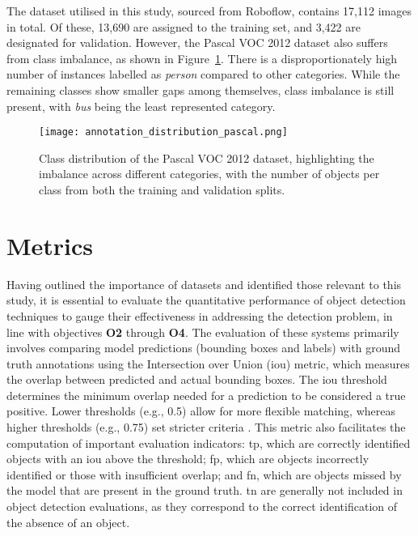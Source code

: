 The dataset utilised in this study, sourced from Roboflow, contains 17,112 images in total. Of these, 13,690 are assigned to the training set, and 3,422 are designated for validation. However, the Pascal VOC 2012 dataset also suffers from class imbalance, as shown in Figure~\ref{fig:class_distribution_pascal_voc}. There is a disproportionately high number of instances labelled as \textit{person} compared to other categories. While the remaining classes show smaller gaps among themselves, class imbalance is still present, with \textit{bus} being the least represented category.

\begin{figure}[!ht]
    \centering
    \texttt{[image: annotation\_distribution\_pascal.png]}
    \caption{Class distribution of the Pascal VOC 2012 dataset, highlighting the imbalance across different categories, with the number of objects per class from both the training and validation splits.}
    \label{fig:class_distribution_pascal_voc}%
\end{figure}

\section{Metrics}
\label{sec:4_metrics}

Having outlined the importance of datasets and identified those relevant to this study, it is essential to evaluate the quantitative performance of object detection techniques to gauge their effectiveness in addressing the detection problem, in line with objectives \textbf{O2} through \textbf{O4}. The evaluation of these systems primarily involves comparing model predictions (bounding boxes and labels) with ground truth annotations using the Intersection over Union (\gls{iou}) metric, which measures the overlap between predicted and actual bounding boxes. The \gls{iou} threshold determines the minimum overlap needed for a prediction to be considered a true positive. Lower thresholds (e.g., 0.5) allow for more flexible matching, whereas higher thresholds (e.g., 0.75) set stricter criteria \cite{coco}. This metric also facilitates the computation of important evaluation indicators: \gls{tp}, which are correctly identified objects with an \gls{iou} above the threshold; \gls{fp}, which are objects incorrectly identified or those with insufficient overlap; and \gls{fn}, which are objects missed by the model that are present in the ground truth. \gls{tn} are generally not included in object detection evaluations, as they correspond to the correct identification of the absence of an object.

